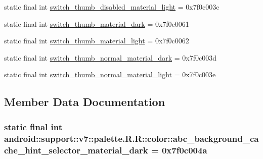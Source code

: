 \begin{CompactItemize}
\item 
static final int \hyperlink{classandroid_1_1support_1_1v7_1_1palette_1_1_r_1_1color_9a7705e039ad47dd9114ff14339933b4}{switch\_\-thumb\_\-disabled\_\-material\_\-light} = 0x7f0c003c
\item 
static final int \hyperlink{classandroid_1_1support_1_1v7_1_1palette_1_1_r_1_1color_80eb81572c852ac132ee73a796f5f479}{switch\_\-thumb\_\-material\_\-dark} = 0x7f0c0061
\item 
static final int \hyperlink{classandroid_1_1support_1_1v7_1_1palette_1_1_r_1_1color_fd1f4d7e5ab388d1b1f5279c1f754995}{switch\_\-thumb\_\-material\_\-light} = 0x7f0c0062
\item 
static final int \hyperlink{classandroid_1_1support_1_1v7_1_1palette_1_1_r_1_1color_15f54deab9affc71cf44d955eb30e5a7}{switch\_\-thumb\_\-normal\_\-material\_\-dark} = 0x7f0c003d
\item 
static final int \hyperlink{classandroid_1_1support_1_1v7_1_1palette_1_1_r_1_1color_1f0147a3472e97d3c0cc019cacb9e6cb}{switch\_\-thumb\_\-normal\_\-material\_\-light} = 0x7f0c003e
\end{CompactItemize}


\subsection{Member Data Documentation}
\hypertarget{classandroid_1_1support_1_1v7_1_1palette_1_1_r_1_1color_bccfe5d8530188090c0a37adaf630d8b}{
\subsubsection[{abc\_\-background\_\-cache\_\-hint\_\-selector\_\-material\_\-dark}]{\setlength{\rightskip}{0pt plus 5cm}static final int android::support::v7::palette.R.R::color::abc\_\-background\_\-cache\_\-hint\_\-selector\_\-material\_\-dark = 0x7f0c004a}}
\label{classandroid_1_1support_1_1v7_1_1palette_1_1_r_1_1color_bccfe5d8530188090c0a37adaf630d8b}


